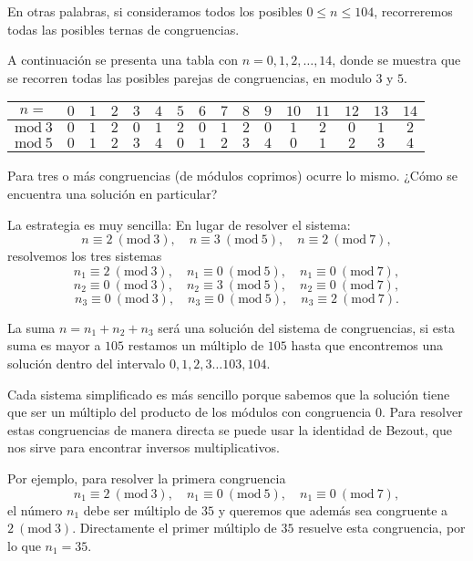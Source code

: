 En otras palabras, si consideramos todos los posibles  $0\leq n\leq 104$, recorreremos todas las posibles ternas de congruencias.

A continuación se presenta una tabla con $n=0,1,2,\dots,14$, donde se muestra que se recorren todas las posibles parejas de congruencias, en modulo $3$ y $5$. 

\begin{tabular}{|c||c|c|c|c|c|c|c|c|c|c|c|c|c|c|c|} 
 \hline
  $n=$ & $0$ & $1$ & $2$ & $3$ & $4$ & $5$ & $6$ & $7$ & $8$ & $9$ & $10$ & $11$ & $12$ & $13$ & $14$ \\ 
  \hline
  \hline
  $\mathrm {mod}~3$ & $0$ & $1$ & $2$ & $0$ & $1$ & $2$ & $0$ & $1$ & $2$ & $0$ & $1$ & $2$ & $0$ & $1$ & $2$ \\ 
  \hline
  $\mathrm {mod}~5$ & $0$ & $1$ & $2$ & $3$ & $4$ & $0$ & $1$ & $2$ & $3$ & $4$ & $0$ & $1$ & $2$ & $3$ & $4$ \\
  \hline
  \end{tabular}

Para tres o más congruencias (de módulos coprimos) ocurre lo mismo. ¿Cómo se encuentra una solución en particular?

La estrategia es muy sencilla: En lugar de resolver el sistema:
$$n\equiv 2 ~(\mathrm {mod}~3), \quad n\equiv 3 ~(\mathrm {mod}~5), \quad n\equiv 2 ~(\mathrm {mod}~7),$$
resolvemos los tres sistemas
$$n_1\equiv 2 ~(\mathrm {mod}~3), \quad n_1\equiv 0 ~(\mathrm {mod}~5), \quad n_1\equiv 0 ~(\mathrm {mod}~7),$$
$$n_2\equiv 0 ~(\mathrm {mod}~3), \quad n_2\equiv 3 ~(\mathrm {mod}~5), \quad n_2\equiv 0 ~(\mathrm {mod}~7),$$
$$n_3\equiv 0 ~(\mathrm {mod}~3), \quad n_3\equiv 0 ~(\mathrm {mod}~5), \quad n_3\equiv 2 ~(\mathrm {mod}~7).$$

La suma $n=n_1+n_2+n_3$ será una solución del sistema de congruencias, si esta suma es mayor a $105$ restamos un múltiplo de $105$ hasta que encontremos una solución dentro del intervalo $0,1,2,3 \dots  103,104$.

Cada sistema simplificado es más sencillo porque sabemos que la solución tiene que ser un múltiplo del producto de los módulos con congruencia $0$. Para resolver estas congruencias de manera directa se puede usar la identidad de Bezout, que nos sirve para encontrar inversos multiplicativos.

Por ejemplo, para resolver la primera congruencia $$n_1\equiv 2 ~(\mathrm {mod}~3), \quad n_1\equiv 0 ~(\mathrm {mod}~5), \quad n_1\equiv 0 ~(\mathrm {mod}~7),$$ el número $n_1$ debe ser múltiplo de $35$ y queremos que además sea congruente a $2 ~(\mathrm {mod}~3)$. Directamente el primer múltiplo de $35$ resuelve esta congruencia, por lo que $n_1=35$.

